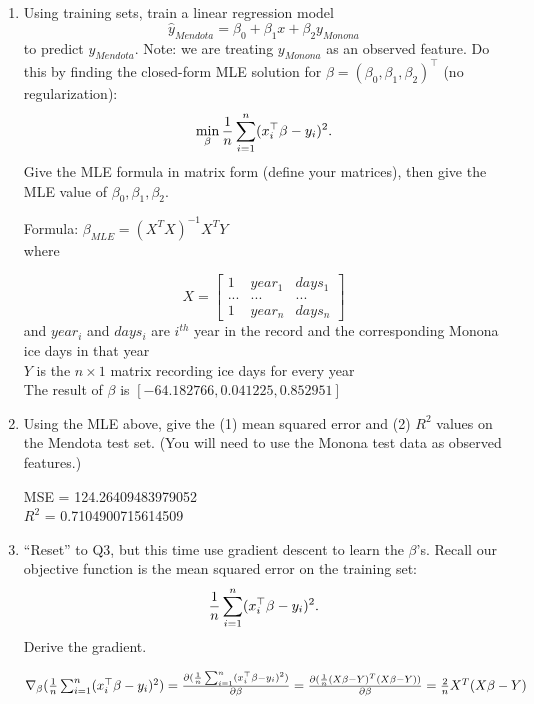 \documentclass[a4paper]{article}
\theoremstyle{definition}
\newenvironment{soln}{
    \leavevmode\color{blue}\ignorespaces
}{}
\begin{document}
\begin{enumerate}
\item
Using training sets, train a linear regression model
$$\hat y_{Mendota} = \beta_0 + \beta_1 x + \beta_2 y_{Monona}$$
to predict $y_{Mendota}$.
Note: we are treating $y_{Monona}$ as an observed feature.
Do this by finding the closed-form MLE solution for $\beta=(\beta_0, \beta_1, \beta_2)^\top$ (no regularization):
$$\min_\beta {1\over n} \sum_{i=1}^n (x_i^\top \beta - y_i)^2.$$
Give the MLE formula in matrix form (define your matrices), then give the MLE value of $\beta_0, \beta_1, \beta_2$. 

\begin{soln}
Formula: $\beta_{MLE} =  (X^TX)^{-1}X^TY$\\
where 

$$  
X =
\begin{bmatrix}
   1 & year_1 & days_1 \\
   ...& ... & ... \\
   1 & year_{n} & days_{n} 
 \end{bmatrix} $$ 
and $year_i$ and $days_i$ are $i^{th}$ year in the record and the corresponding Monona ice days in that year\\
$Y$ is the $n\times 1$ matrix recording ice days for every year\\
The result of $\beta$ is $[-64.182766, 0.041225, 0.852951]$

\end{soln} 


\item
Using the MLE above, give the (1) mean squared error and (2) $R^2$ values on the Mendota test set.
(You will need to use the Monona test data as observed features.)


\begin{soln}
MSE = 124.26409483979052\\ 
$R^{2}$ = 0.7104900715614509
\end{soln}

\item
``Reset'' to Q3, but this time use gradient descent to learn the $\beta$'s.
Recall our objective function is the mean squared error on the training set:
$${1\over n} \sum_{i=1}^n (x_i^\top \beta - y_i)^2.$$
Derive the gradient.

\begin{soln}
$\nabla_{\beta}({1\over n} \sum_{i=1}^n (x_i^\top \beta - y_i)^2) \\\\= \frac{\partial ({1\over n} \sum_{i=1}^n (x_i^\top \beta - y_i)^2)}{\partial \beta} \\= \frac{\partial (\frac{1}{n}(X\beta - Y)^T(X\beta - Y))}{\partial \beta}\\= \frac{2}{n}X^T(X\beta - Y)$
\end{soln}


\end{enumerate}
\end{document}
